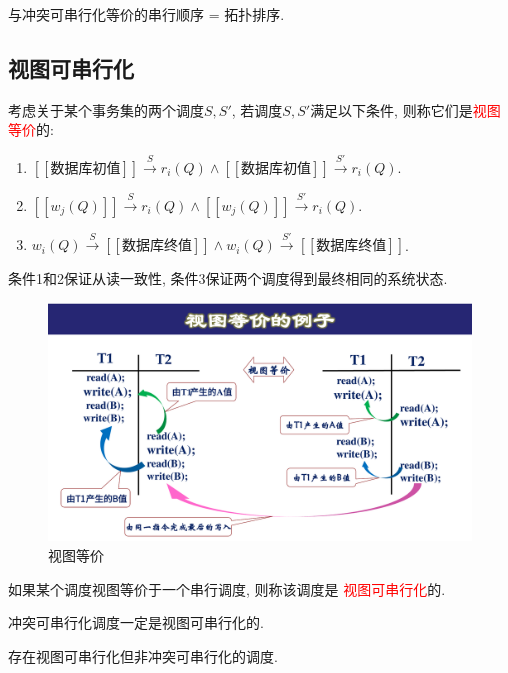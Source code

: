 与冲突可串行化等价的串行顺序 = 拓扑排序.

\subsection{视图可串行化}

\begin{definition}[视图等价]
  考虑关于某个事务集的两个调度$S,S'$, 若调度$S,S'$满足以下条件, 则称它们是\textcolor{red}{视图等价}的:
  \begin{enumerate}
      \item $[\![\text{数据库初值}]\!]\overset{S}{\to}r_i(Q)\land [\![\text{数据库初值}]\!]\overset{S'}{\to}r_i(Q)$.
      \item $[\![w_j(Q)]\!]\overset{S}{\to}r_i(Q)\land [\![w_j(Q)]\!]\overset{S'}{\to}r_i(Q)$.
      \item $w_i(Q)\overset{S}{\to}[\![\text{数据库终值}]\!]\land w_i(Q)\overset{S'}{\to}[\![\text{数据库终值}]\!]$.
  \end{enumerate}
\end{definition}
\begin{remark}
  条件1和2保证从读一致性, 条件3保证两个调度得到最终相同的系统状态.
\end{remark}

\begin{figure}[H]
    \centering
    \includegraphics[width=.7\textwidth]{./figure/视图等价.pdf}
    \caption{视图等价}
\end{figure}


\begin{definition}[视图可串行化]
  如果某个调度视图等价于一个串行调度, 则称该调度是
  \textcolor{red}{视图可串行化}的.
\end{definition}

\begin{corollary}
  冲突可串行化调度一定是视图可串行化的.
\end{corollary}

\begin{corollary}
  存在视图可串行化但非冲突可串行化的调度.
\end{corollary}

